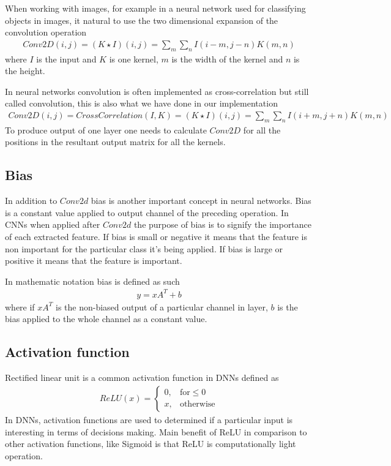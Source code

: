 \documentclass[12pt,a4paper,english
]{tunithesis}
\begin{document}
When working with images, for example in a neural network used for classifying objects in images, it  natural to use the two dimensional expansion of the convolution operation
\begin{align}
  Conv2D(i, j) = (K \star I)(i,j) = \sum_{m}\sum_{n}I(i-m,j-n)K(m, n)
\end{align}
where $I$ is the input and $K$ is one kernel, $m$ is the width of the kernel and $n$ is the height.

In neural networks convolution is often implemented as cross-correlation but still called convolution, this is also what we have done in our implementation
\begin{align}
  Conv2D(i,j) = CrossCorrelation(I, K) = (K \star I)(i,j) = \sum_{m}\sum_{n}I(i+m,j+n)K(m, n)
\end{align}
To produce output of one layer one needs to calculate $Conv2D$ for all the positions in the resultant output matrix for all the kernels.

\subsection{Bias}
In addition to $Conv2d$ bias is another important concept in neural networks. Bias is a constant value applied to output channel of the preceding operation. In CNNs when applied after $Conv2d$ the purpose of bias is to signify the importance of each extracted feature. If bias is small or negative it means that the feature is non important for the particular class it's being applied. If bias is large or positive it means that the feature is important.

In mathematic notation bias is defined as such
\begin{align}
  y = xA^{T} + b
\end{align}
where if $xA^{T}$ is the non-biased output of a particular channel in layer, $b$ is the bias applied to the whole channel as a constant value.

\subsection{Activation function}
Rectified linear unit is a common activation function in DNNs defined as
\begin{align}
 ReLU(x) =
  \begin{cases}
  0, & \text{for} \leq 0 \\
    x, &  \text{otherwise}
  \end{cases}
\end{align}
In DNNs, activation functions are used to determined if a particular input is interesting in terms of decisions making. Main benefit of ReLU in comparison to other activation functions, like Sigmoid is that ReLU is computationally light operation.
\end{document}
